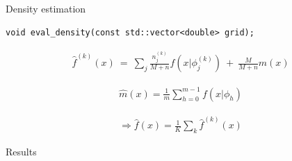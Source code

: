 \begin{frame}[fragile]{Density estimation}


\begin{verbatim}
void eval_density(const std::vector<double> grid);
\end{verbatim}

\begin{equation}
	\begin{aligned} \nonumber
	\hat f^{(k)}(x) \ = \ \sum_j \frac{n^{(k)}_j}{M+n} f\left(x | \phi^{(k)}_j\right) \ + \ \frac{M}{M+n} m(x)
	\end{aligned}
\end{equation}

\begin{equation}
	\begin{aligned} \nonumber
		\hat m(x) = \frac{1}{m} \sum_{h=0}^{m-1}  f\left(x | \phi_h\right)
	\end{aligned}
\end{equation}

\begin{equation}
	\begin{aligned} \nonumber
 \Longrightarrow \hat f(x) = \frac{1}{K} \sum_k \hat f^{(k)}(x) 
\end{aligned}
\end{equation}

\end{frame}

\begin{frame}[c]
	\begin{center}
		\huge \color{blue} Results
	\end{center}
\end{frame}



